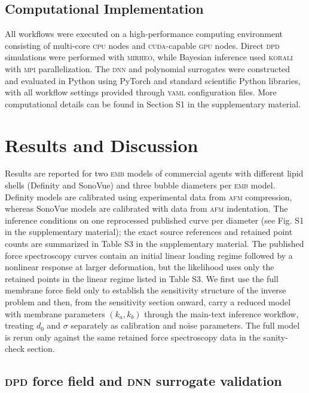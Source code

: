 \documentclass[%
 aip,
 jcp,
 amsmath,amssymb,
 preprint,%
]{revtex4-1}
\begin{document}
\subsection{Computational Implementation}
\label{sec:meth:implementation}

\noindent All workflows were executed on a high-performance computing environment consisting of multi-core \textsc{cpu} nodes and \textsc{cuda}-capable \textsc{gpu} nodes. Direct \textsc{dpd} simulations were performed with \textsc{mirheo}, while Bayesian inference used \textsc{korali} with \textsc{mpi} parallelization. The \textsc{dnn} and polynomial surrogates were constructed and evaluated in Python using PyTorch and standard scientific Python libraries, with all workflow settings provided through \textsc{yaml} configuration files. More computational details can be found in Section S1 in the supplementary material.


\section{Results and Discussion}
\label{sec:results}

Results are reported for two \textsc{emb} models of commercial agents with different lipid shells (Definity and SonoVue) and three bubble diameters per \textsc{emb} model. Definity models are calibrated using experimental data from \textsc{afm} compression, whereas SonoVue models are calibrated with data from \textsc{afm} indentation. The inference conditions on one reprocessed published curve per diameter (see Fig. S1 in the supplementary material); the exact source references and retained point counts are summarized in Table S3 in the supplementary material. The published force spectroscopy curves contain an initial linear loading regime followed by a nonlinear response at larger deformation, but the likelihood uses only the retained points in the linear regime listed in Table S3. We first use the full membrane force field only to establish the sensitivity structure of the inverse problem and then, from the sensitivity section onward, carry a reduced model with membrane parameters $(k_a,k_b)$ through the main-text inference workflow, treating $d_0$ and $\sigma$ separately as calibration and noise parameters. The full model is rerun only against the same retained force spectroscopy data in the sanity-check section. 

\subsection{{\textsc{dpd}} force field and \textsc{dnn} surrogate validation}
\label{sec:res:dpd_surrogate}
\end{document}
